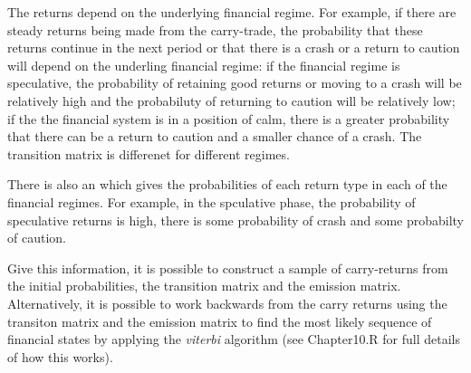 \documentclass[12pt, a4paper, oneside]{article} %
\begin{document}
The returns depend on the underlying financial regime.  For example, if there are steady returns being made from the carry-trade, the probability that these returns continue in the next period or that there is a crash or a return to caution will depend on the underling financial regime:  if the financial regime is speculative, the probability of retaining good returns or moving to a crash will be relatively high and the probabiluty of returning to caution will be relatively low; if the the financial system is in a position of calm, there is a greater probability that there can be a return to caution and a smaller chance of a crash.  The transition matrix is differenet for different regimes. 

There is also an %
which gives the probabilities of each return type in each of the financial regimes. For example, in the spculative phase, the probability of speculative returns is high, there is some probability of crash and some probabilty of caution. 

Give this information, it is possible to construct a sample of carry-returns from the initial probabilities, the transition matrix and the emission matrix.  Alternatively, it is possible to work backwards from the carry returns using the  transiton matrix and the emission matrix to find the most likely sequence of financial states by applying the \emph{viterbi} algorithm (see Chapter10.R for full details of how this works).  
\end{document}
